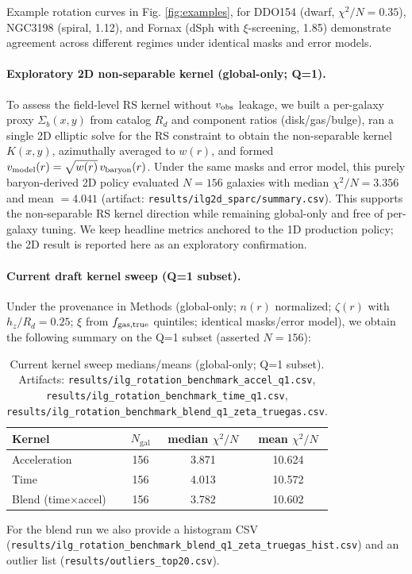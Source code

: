 \documentclass[12pt,a4paper]{article}
\begin{document}
Example rotation curves in Fig. \ref{fig:examples}, for DDO154 (dwarf, $\chi^2/N=0.35$), NGC3198 (spiral, 1.12), and Fornax (dSph with $\xi$-screening, 1.85) demonstrate agreement across different regimes under identical masks and error models.

\paragraph{Exploratory 2D non-separable kernel (global-only; Q=1).} To assess the field-level RS kernel without $v_{\rm obs}$ leakage, we built a per-galaxy proxy $\Sigma_b(x,y)$ from catalog $R_d$ and component ratios (disk/gas/bulge), ran a single 2D elliptic solve for the RS constraint to obtain the non-separable kernel $K(x,y)$, azimuthally averaged to $w(r)$, and formed $v_{\rm model}(r)=\sqrt{w(r)}\,v_{\rm baryon}(r)$. Under the same masks and error model, this purely baryon-derived 2D policy evaluated $N=156$ galaxies with median $\chi^2/N=\mathbf{3.356}$ and mean $=\mathbf{4.041}$ (artifact: \texttt{results/ilg2d\_sparc/summary.csv}). This supports the non-separable RS kernel direction while remaining global-only and free of per-galaxy tuning. We keep headline metrics anchored to the 1D production policy; the 2D result is reported here as an exploratory confirmation.

\paragraph{Current draft kernel sweep (Q=1 subset).} Under the provenance in Methods (global-only; $n(r)$ normalized; $\zeta(r)$ with $h_z/R_d=0.25$; $\xi$ from $f_{\rm gas,true}$ quintiles; identical masks/error model), we obtain the following summary on the Q=1 subset (asserted $N=156$):
\begin{table}[h]
\centering
\caption{Current kernel sweep medians/means (global-only; Q=1 subset). Artifacts: \texttt{results/ilg\_rotation\_benchmark\_accel\_q1.csv}, \texttt{results/ilg\_rotation\_benchmark\_time\_q1.csv}, \texttt{results/ilg\_rotation\_benchmark\_blend\_q1\_zeta\_truegas.csv}.}
\label{tab:kernel_sweep_current}
\begin{tabular}{l c c c}
\toprule
Kernel & $N_\mathrm{gal}$ & median $\chi^2/N$ & mean $\chi^2/N$ \\
\midrule
Acceleration & 156 & 3.871 & 10.624 \\
Time         & 156 & 4.013 & 10.572 \\
Blend (time$\times$accel) & 156 & 3.782 & 10.602 \\
\bottomrule
\end{tabular}
\end{table}
For the blend run we also provide a histogram CSV (\texttt{results/ilg\_rotation\_benchmark\_blend\_q1\_zeta\_truegas\_hist.csv}) and an outlier list (\texttt{results/outliers\_top20.csv}).
\end{document}
